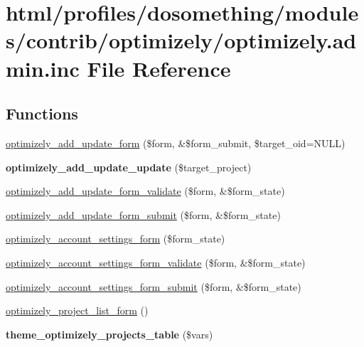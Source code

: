 \hypertarget{optimizely_8admin_8inc}{
\section{html/profiles/dosomething/modules/contrib/optimizely/optimizely.admin.inc File Reference}
\label{optimizely_8admin_8inc}
}
\subsection*{Functions}
\begin{DoxyCompactItemize}
\item 
\hyperlink{optimizely_8admin_8inc_a0fc8c1fbac099f105600ffd2865754fb}{optimizely\_\-add\_\-update\_\-form} (\$form, \&\$form\_\-submit, \$target\_\-oid=NULL)
\item 
\hypertarget{optimizely_8admin_8inc_a99ba5b7223a8944cfa087b2291789d75}{
{\bfseries optimizely\_\-add\_\-update\_\-update} (\$target\_\-project)}
\label{optimizely_8admin_8inc_a99ba5b7223a8944cfa087b2291789d75}

\item 
\hyperlink{optimizely_8admin_8inc_a0c8b48847f329db64088c055f76fd454}{optimizely\_\-add\_\-update\_\-form\_\-validate} (\$form, \&\$form\_\-state)
\item 
\hyperlink{optimizely_8admin_8inc_a7f0e4b00345ac2158e53abc90d337245}{optimizely\_\-add\_\-update\_\-form\_\-submit} (\$form, \&\$form\_\-state)
\item 
\hyperlink{optimizely_8admin_8inc_ae966f802e083e18ee8da09dac92afab3}{optimizely\_\-account\_\-settings\_\-form} (\$form\_\-state)
\item 
\hyperlink{optimizely_8admin_8inc_ab80ac0f449517fefe2a1672bfdc6e711}{optimizely\_\-account\_\-settings\_\-form\_\-validate} (\$form, \&\$form\_\-state)
\item 
\hyperlink{optimizely_8admin_8inc_ae02dda6fe86e05f5b06a202a2d099b88}{optimizely\_\-account\_\-settings\_\-form\_\-submit} (\$form, \&\$form\_\-state)
\item 
\hyperlink{optimizely_8admin_8inc_aa9928175901069d6541dfaea2b907aec}{optimizely\_\-project\_\-list\_\-form} ()
\item 
\hypertarget{optimizely_8admin_8inc_af2ef0565e64f6b8549b1829c429808da}{
{\bfseries theme\_\-optimizely\_\-projects\_\-table} (\$vars)}
\label{optimizely_8admin_8inc_af2ef0565e64f6b8549b1829c429808da}


\end{DoxyCompactItemize}
